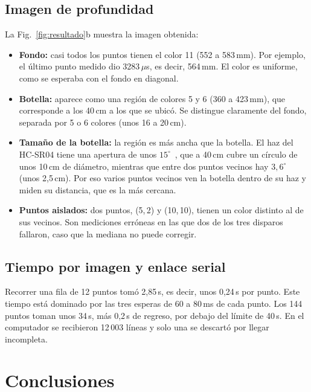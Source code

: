 \documentclass[conference]{IEEEtran}
\newcommand{\us}{\,$\mu$s}
\begin{document}
\subsection{Imagen de profundidad}
La Fig.~\ref{fig:resultado}b muestra la imagen obtenida:
\begin{itemize}
\item \textbf{Fondo:} casi todos los puntos tienen el color 11 (552 a 583\,mm). Por ejemplo, el último punto medido dio 3283\us, es decir, 564\,mm. El color es uniforme, como se esperaba con el fondo en diagonal.
\item \textbf{Botella:} aparece como una región de colores 5 y 6 (360 a 423\,mm), que corresponde a los 40\,cm a los que se ubicó. Se distingue claramente del fondo, separada por 5 o 6 colores (unos 16 a 20\,cm).
\item \textbf{Tamaño de la botella:} la región es más ancha que la botella. El haz del HC-SR04 tiene una apertura de unos $15^\circ$~\cite{hcsr04}, que a 40\,cm cubre un círculo de unos 10\,cm de diámetro, mientras que entre dos puntos vecinos hay $3{,}6^\circ$ (unos 2,5\,cm). Por eso varios puntos vecinos ven la botella dentro de su haz y miden su distancia, que es la más cercana.
\item \textbf{Puntos aislados:} dos puntos, (5,\,2) y (10,\,10), tienen un color distinto al de sus vecinos. Son mediciones erróneas en las que dos de los tres disparos fallaron, caso que la mediana no puede corregir.
\end{itemize}

\subsection{Tiempo por imagen y enlace serial}
Recorrer una fila de 12 puntos tomó 2,85\,s, es decir, unos 0,24\,s por punto. Este tiempo está dominado por las tres esperas de 60 a 80\,ms de cada punto. Los 144 puntos toman unos 34\,s, más 0,2\,s de regreso, por debajo del límite de 40\,s. En el computador se recibieron 12\,003 líneas y solo una se descartó por llegar incompleta.

\section{Conclusiones}
\end{document}
